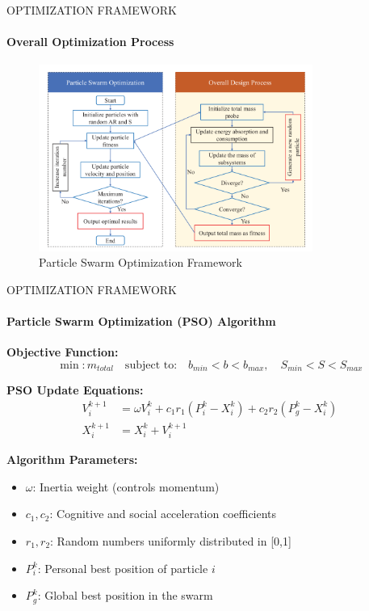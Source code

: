 \documentclass{beamer}
\begin{document}
\begin{frame}{OPTIMIZATION FRAMEWORK}
    \framesubtitle{Overall Optimization Process}
    \begin{figure}
        \centering
        \includegraphics[width=0.8\textwidth]{optimation_framework.png} %
        \caption{Particle Swarm Optimization Framework}
        \label{fig:optimization_framework}
    \end{figure}
\end{frame}

\begin{frame}{OPTIMIZATION FRAMEWORK}
    \framesubtitle{Particle Swarm Optimization (PSO) Algorithm}
    
    \textbf{Objective Function:}
    \begin{equation*}
        \min: m_{total} \quad \text{subject to:} \quad b_{min} < b < b_{max}, \quad S_{min} < S < S_{max}
    \end{equation*}
    
    \textbf{PSO Update Equations:}
    \begin{align*}
        V_i^{k+1} &= \omega V_i^k + c_1 r_1 (P_i^k - X_i^k) + c_2 r_2 (P_g^k - X_i^k) \\
        X_i^{k+1} &= X_i^k + V_i^{k+1}
    \end{align*}
    
    \textbf{Algorithm Parameters:}
    \begin{itemize}
        \item $\omega$: Inertia weight (controls momentum)
        \item $c_1, c_2$: Cognitive and social acceleration coefficients
        \item $r_1, r_2$: Random numbers uniformly distributed in [0,1]
        \item $P_i^k$: Personal best position of particle $i$
        \item $P_g^k$: Global best position in the swarm
    \end{itemize}
\end{frame}
\end{document}
